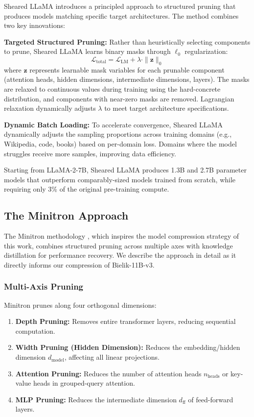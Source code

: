\documentclass{article}
\begin{document}
Sheared LLaMA \cite{xia2024sheared} introduces a principled approach to structured pruning that produces models matching specific target architectures. The method combines two key innovations:

\textbf{Targeted Structured Pruning:} Rather than heuristically selecting components to prune, Sheared LLaMA learns binary masks through $\ell_0$ regularization:
\begin{equation}
    \mathcal{L}_{\text{total}} = \mathcal{L}_{\text{LM}} + \lambda \cdot \|\mathbf{z}\|_0
\end{equation}
where $\mathbf{z}$ represents learnable mask variables for each prunable component (attention heads, hidden dimensions, intermediate dimensions, layers). The masks are relaxed to continuous values during training using the hard-concrete distribution, and components with near-zero masks are removed. Lagrangian relaxation dynamically adjusts $\lambda$ to meet target architecture specifications.

\textbf{Dynamic Batch Loading:} To accelerate convergence, Sheared LLaMA dynamically adjusts the sampling proportions across training domains (e.g., Wikipedia, code, books) based on per-domain loss. Domains where the model struggles receive more samples, improving data efficiency.

Starting from LLaMA-2-7B, Sheared LLaMA produces 1.3B and 2.7B parameter models that outperform comparably-sized models trained from scratch, while requiring only 3\% of the original pre-training compute.

\subsection{The Minitron Approach}

The Minitron methodology \cite{sreenivas2024llm, muralidharan2024compact}, which inspires the model compression strategy of this work, combines structured pruning across multiple axes with knowledge distillation for performance recovery. We describe the approach in detail as it directly informs our compression of Bielik-11B-v3.

\subsubsection{Multi-Axis Pruning}

Minitron prunes along four orthogonal dimensions:

\begin{enumerate}
    \item \textbf{Depth Pruning:} Removes entire transformer layers, reducing sequential computation.
    \item \textbf{Width Pruning (Hidden Dimension):} Reduces the embedding/hidden dimension $d_{\text{model}}$, affecting all linear projections.
    \item \textbf{Attention Pruning:} Reduces the number of attention heads $n_{\text{heads}}$ or key-value heads in grouped-query attention.
    \item \textbf{MLP Pruning:} Reduces the intermediate dimension $d_{\text{ff}}$ of feed-forward layers.
\end{enumerate}
\end{document}
